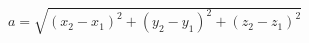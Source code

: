 \documentclass{standalone}
\begin{document}
    $a = \sqrt{ (x_2 - x_1)^2 + (y_2 - y_1)^2 + (z_2 - z_1)^2 }$
\end{document}
